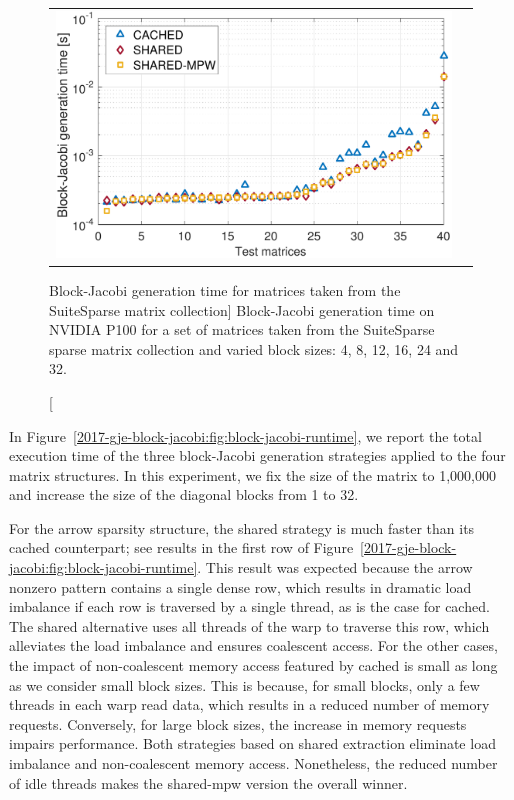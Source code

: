\begin{figure}[t]
\begin{center}
{\begin{tabular}{cc}
\includegraphics[width=.46\columnwidth]{plots/BJ_generation_time_32.pdf}\\
\end{tabular}
}
\end{center}
\caption
[Block-Jacobi generation time for matrices taken from the SuiteSparse matrix
collection]
{
Block-Jacobi generation time on NVIDIA P100
for a set of matrices taken from the SuiteSparse sparse matrix collection and varied 
block sizes: 4, 8, 12, 16, 24 and 32.
}
\label{2017-gje-block-jacobi:fig:block-jacobi-suitsparse}
\end{figure}


In Figure~\ref{2017-gje-block-jacobi:fig:block-jacobi-runtime}, we report the total execution time of
the three block-Jacobi generation strategies applied to the four matrix
structures. In this experiment, we fix the size of the matrix to 1,000,000 and
increase the size of the diagonal blocks from 1 to 32.

For the arrow sparsity structure, the {\sc shared} strategy is much faster than
its {\sc cached} counterpart; see results in the first row of
Figure~\ref{2017-gje-block-jacobi:fig:block-jacobi-runtime}. This result was expected because the arrow nonzero
pattern contains a single dense row, which results in dramatic load imbalance if
each row is traversed by a single thread, as is the case for {\sc cached}. The
{\sc shared} alternative uses all threads of the warp to traverse this row,
which alleviates the load imbalance and ensures coalescent access. For the other
cases, the impact of non-coalescent memory access featured by {\sc cached} is
small as long as we consider small block sizes. This is because, for small
blocks, only a few threads in each warp read data, which results in a reduced number
of memory requests. Conversely, for large block sizes, the increase in memory
requests impairs performance. Both strategies based on shared extraction
eliminate load imbalance and non-coalescent memory access. Nonetheless, the
reduced number of idle threads makes the {\sc shared-mpw} version the overall
winner.

